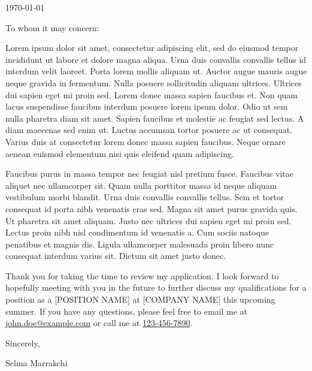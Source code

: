 \documentclass{CoverLetter}
\begin{document}
\coverletterheader[
    firstname=Selma,
    middleinitial=,
    lastname=Marrakchi,
    email=sm5175@columbia.edu,
    phone=857-928-7875,
    linkedin=selmamarrakchi,
    city=New York,
    state=NY
]

\vspace{0.25in}
\today
\vspace{0.15in}


To whom it may concern:

Lorem ipsum dolor sit amet, consectetur adipiscing elit, sed do eiusmod
tempor incididunt ut labore et dolore magna aliqua. Urna duis convallis
convallis tellus id interdum velit laoreet. Porta lorem mollis aliquam
ut. Auctor augue mauris augue neque gravida in fermentum. Nulla posuere
sollicitudin aliquam ultrices. Ultrices dui sapien eget mi proin sed.
Lorem donec massa sapien faucibus et. Non quam lacus suspendisse
faucibus interdum posuere lorem ipsum dolor. Odio ut sem nulla pharetra
diam sit amet. Sapien faucibus et molestie ac feugiat sed lectus. A
diam maecenas sed enim ut. Luctus accumsan tortor posuere ac ut
consequat. Varius duis at consectetur lorem donec massa sapien
faucibus. Neque ornare aenean euismod elementum nisi quis eleifend quam
adipiscing.

Faucibus purus in massa tempor nec feugiat nisl pretium fusce. Faucibus
vitae aliquet nec ullamcorper sit. Quam nulla porttitor massa id neque
aliquam vestibulum morbi blandit. Urna duis convallis convallis tellus.
Sem et tortor consequat id porta nibh venenatis cras sed. Magna sit
amet purus gravida quis. Ut pharetra sit amet aliquam. Justo nec
ultrices dui sapien eget mi proin sed. Lectus proin nibh nisl
condimentum id venenatis a. Cum sociis natoque penatibus et magnis dis.
Ligula ullamcorper malesuada proin libero nunc consequat interdum
varius sit. Dictum sit amet justo donec.

Thank you for taking the time to review my application. I look forward
to hopefully meeting with you in the future to further discuss my
qualifications for a position as a [POSITION NAME] at [COMPANY NAME]
this upcoming summer. If you have any questions, please feel free to
email me at \href{mailto:john.doe@example.com}{john.doe@example.com} or
call me at \href{tel:+1-123-456-7890}{123-456-7890}.

Sincerely,

\vspace{.15in}

Selma Marrakchi
\end{document}
